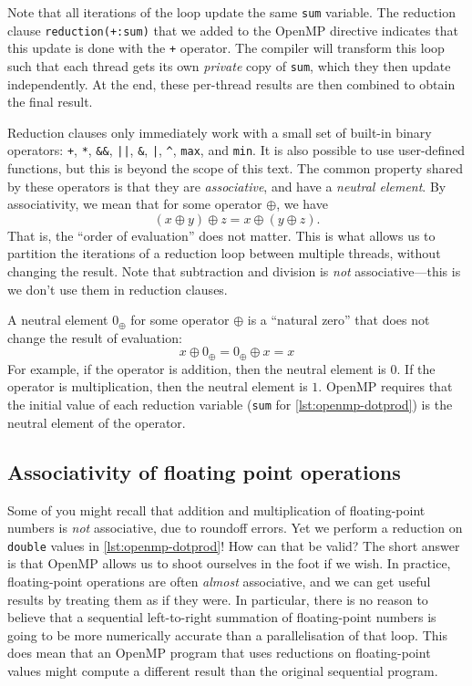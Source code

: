 Note that all iterations of the loop update the same \texttt{sum}
variable.  The reduction clause \texttt{reduction(+:sum)} that we
added to the OpenMP directive indicates that this update is done with
the \lstinline{+} operator.  The compiler will transform this loop
such that each thread gets its own \emph{private} copy of
\texttt{sum}, which they then update independently.  At the end, these
per-thread results are then combined to obtain the final result.

Reduction clauses only immediately work with a small set of built-in
binary operators: \lstinline{+}, \lstinline{*},
\lstinline{&&}, \lstinline{||}, \lstinline{&}, \lstinline{|},
\lstinline{^}, \lstinline{max}, and \lstinline{min}.  It is also
possible to use user-defined functions, but this is beyond the scope
of this text.  The common property shared by these operators is that
they are \emph{associative}, and have a \emph{neutral element}.  By
associativity, we mean that for some operator $\oplus$, we have
\[
  (x \oplus y) \oplus z = x \oplus (y \oplus z).
\]
That is, the ``order of evaluation'' does not matter. This is what
allows us to partition the iterations of a reduction loop between
multiple threads, without changing the result. Note that subtraction
and division is \emph{not} associative---this is we don't use them in
reduction clauses.

A neutral element $0_{\oplus}$ for some operator $\oplus$ is a
``natural zero'' that does not change the result of evaluation:
\[
  x \oplus 0_{\oplus} = 0_{\oplus} \oplus x = x
\]
For example, if the operator is addition, then the neutral element is
$0$.  If the operator is multiplication, then the neutral element is
$1$.  OpenMP requires that the initial value of each reduction
variable (\lstinline{sum} for \cref{lst:openmp-dotprod}) is the
neutral element of the operator.

\subsection{Associativity of floating point operations}

Some of you might recall that addition and multiplication of
floating-point numbers is \emph{not} associative, due to roundoff
errors.  Yet we perform a reduction on \lstinline{double} values in
\cref{lst:openmp-dotprod}!  How can that be valid?  The short answer
is that OpenMP allows us to shoot ourselves in the foot if we wish.
In practice, floating-point operations are often \emph{almost}
associative, and we can get useful results by treating them as if they
were.  In particular, there is no reason to believe that a sequential
left-to-right summation of floating-point numbers is going to be more
numerically accurate than a parallelisation of that loop.  This does
mean that an OpenMP program that uses reductions on floating-point
values might compute a different result than the original sequential
program.

